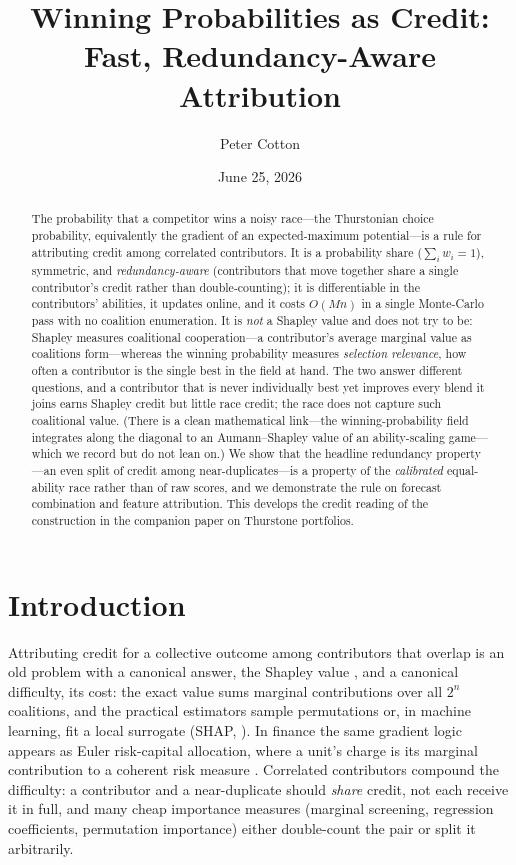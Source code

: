 \documentclass[11pt]{article}
\title{Winning Probabilities as Credit:\\
       Fast, Redundancy-Aware Attribution}
\author{Peter Cotton}
\date{June 25, 2026}
\begin{document}
\maketitle

\begin{abstract}
The probability that a competitor wins a noisy race---the Thurstonian choice
probability, equivalently the gradient of an expected-maximum potential---is a
rule for attributing credit among correlated contributors. It is a probability share
($\sum_i w_i = 1$), symmetric, and \emph{redundancy-aware} (contributors that move
together share a single contributor's credit rather than double-counting); it is
differentiable in the contributors' abilities, it updates online, and it costs
$O(Mn)$ in a single Monte-Carlo pass with no coalition enumeration. It is \emph{not} a
Shapley value and does not try to be: Shapley measures coalitional cooperation---a
contributor's average marginal value as coalitions form---whereas the winning
probability measures \emph{selection relevance}, how often a contributor is the single
best in the field at hand. The two answer different questions, and a contributor that
is never individually best yet improves every blend it joins earns Shapley credit but
little race credit; the race does not capture such coalitional value. (There is a
clean mathematical link---the winning-probability field integrates along the diagonal
to an Aumann--Shapley value of an ability-scaling game---which we record but do not
lean on.) We show that the headline redundancy property---an even split of credit
among near-duplicates---is a property of the \emph{calibrated} equal-ability race
rather than of raw scores, and we demonstrate the rule on forecast combination and
feature attribution. This develops the credit reading of the construction in the
companion paper on Thurstone portfolios.
\end{abstract}

\section{Introduction}
\label{sec:intro}

Attributing credit for a collective outcome among contributors that overlap is an
old problem with a canonical answer, the Shapley value \parencite{shapley1953}, and
a canonical difficulty, its cost: the exact value sums marginal contributions over
all $2^n$ coalitions, and the practical estimators sample permutations
\parencite{strumbelj2014} or, in machine learning, fit a local surrogate (SHAP,
\textcite{lundberg2017}). In finance the same gradient logic appears as Euler
risk-capital allocation, where a unit's charge is its marginal contribution to a
coherent risk measure \parencite{denault2001, kalkbrener2005, tasche2008}.
Correlated contributors compound the difficulty: a
contributor and a near-duplicate should \emph{share} credit, not each receive it in
full, and many cheap importance measures (marginal screening, regression
coefficients, permutation importance) either double-count the pair or split it
arbitrarily.
\end{document}
